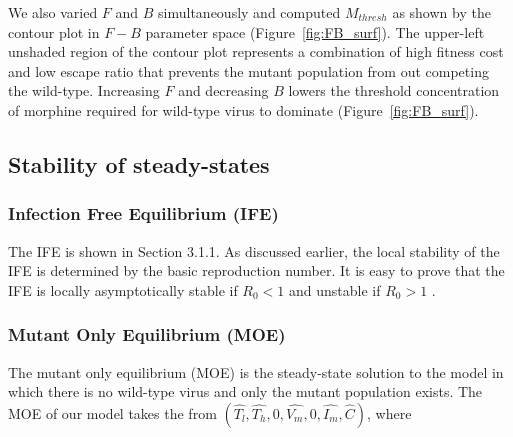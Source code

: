 \documentclass[11pt, oneside]{article}    %
\begin{document}
We also varied $F$ and $B$ simultaneously and computed $M_{thresh}$ as shown by the contour plot in $F-B$ parameter space (Figure~\ref{fig:FB_surf}). The upper-left unshaded region of the contour plot represents a combination of high fitness cost and low escape ratio that prevents the mutant population from out competing the wild-type. Increasing $F$ and decreasing $B$ lowers the threshold concentration of morphine required for wild-type virus to dominate  (Figure~\ref{fig:FB_surf}).

	

\subsection{Stability of steady-states}

\subsubsection{Infection Free Equilibrium (IFE)}

The IFE is shown in Section 3.1.1. As discussed earlier, the local stability of the IFE is determined by the basic reproduction number. It is easy to prove that the IFE is locally asymptotically stable if $R_0 < 1$ and unstable if $R_0 >1$ \cite{Castillo-Chavez}.


\subsubsection{Mutant Only Equilibrium (MOE)}

The mutant only equilibrium (MOE) is the steady-state solution to the model in which there is no wild-type virus and only the mutant population exists. The MOE of our model takes the from $(\hat{T_l}, \hat{T_h},0,\hat{V_m},0,\hat{I_m},\hat{C})$, where
\end{document}
